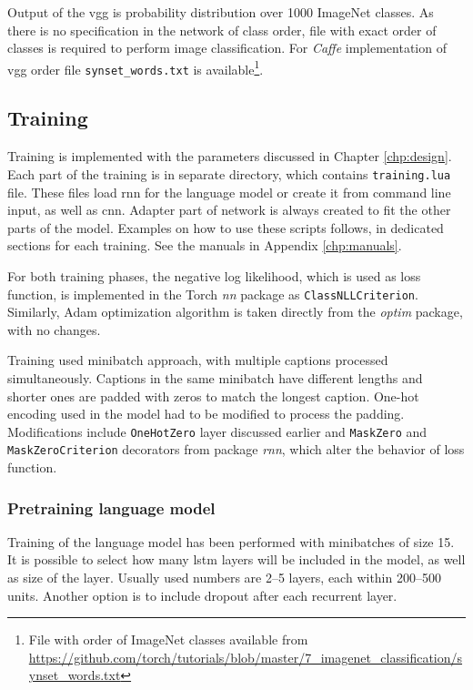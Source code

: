 Output of the \gls{vgg} is probability distribution over 1000 ImageNet classes. As there is no specification in the network of class order, file with exact order of classes is required to perform image classification. For \emph{Caffe} implementation of \gls{vgg} order file \texttt{synset\_words.txt} is available\footnote{File with order of ImageNet classes available from \url{https://github.com/torch/tutorials/blob/master/7_imagenet_classification/synset_words.txt}}.

\subsection{Training}\label{subsec:training}

Training is implemented with the parameters discussed in Chapter \ref{chp:design}. Each part of the training is in separate directory, which contains \texttt{training.lua} file. These files load \gls{rnn} for the language model or create it from command line input, as well as \gls{cnn}. Adapter part of network is always created to fit the other parts of the model. Examples on how to use these scripts follows, in dedicated sections for each training. See the manuals in Appendix \ref{chp:manuals}.

For both training phases, the negative log likelihood, which is used as loss function, is implemented in the Torch \emph{nn} package as \texttt{ClassNLLCriterion}. Similarly, Adam optimization algorithm is taken directly from the \emph{optim} package, with no changes.

Training used minibatch approach, with multiple captions processed simultaneously. Captions in the same minibatch have different lengths and shorter ones are padded with zeros to match the longest caption. One-hot encoding used in the model had to be modified to process the padding. Modifications include \texttt{OneHotZero} layer discussed earlier and \texttt{MaskZero} and \texttt{MaskZeroCriterion} decorators from package \emph{rnn}, which alter the behavior of loss function.

\subsubsection{Pretraining language model}

Training of the language model has been performed with minibatches of size 15. It is possible to select how many \gls{lstm} layers will be included in the model, as well as size of the layer. Usually used numbers are 2--5 layers, each within 200--500 units. Another option is to include dropout after each recurrent layer.

